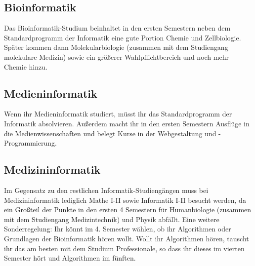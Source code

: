 \subsection*{Bioinformatik}
	
Das Bioinformatik-Studium beinhaltet in den ersten Semestern neben dem Standardprogramm der Informatik eine gute Portion Chemie und Zellbiologie. Später kommen dann Molekularbiologie (zusammen mit dem Studiengang molekulare Medizin) sowie ein größerer Wahlpflichtbereich und noch mehr Chemie hinzu.
\pagebreak 
\subsection*{Medieninformatik}
	
Wenn ihr Medieninformatik studiert, müsst ihr das Standardprogramm der Informatik absolvieren. Außerdem macht ihr in den ersten Semestern Ausflüge in die Medienwissenschaften und belegt Kurse in der Webgestaltung und -Programmierung.
\subsection*{Medizininformatik}
	
Im Gegensatz zu den restlichen Informatik-Studiengängen muss bei Medizininformatik lediglich Mathe I-II sowie Informatik I-II besucht werden, da ein Großteil der Punkte in den ersten 4 Semestern für Humanbiologie (zusammen mit dem Studiengang Medizintechnik) und Physik abfällt. Eine weitere Sonderregelung: Ihr könnt im 4. Semester wählen, ob ihr Algorithmen oder Grundlagen der Bioinformatik hören wollt. Wollt ihr Algorithmen hören, tauscht ihr das am besten mit dem Studium Professionale, so dass ihr dieses im vierten Semester hört und Algorithmen im fünften.

\pagebreak